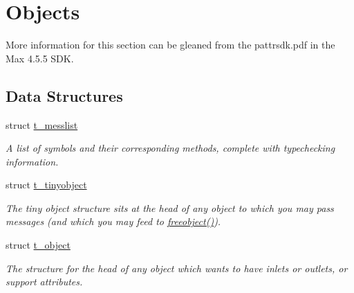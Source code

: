 \hypertarget{group__obj}{
\section{Objects}
\label{group__obj}
}


More information for this section can be gleaned from the pattrsdk.pdf in the Max 4.5.5 SDK.  
\subsection*{Data Structures}
\begin{DoxyCompactItemize}
\item 
struct \hyperlink{structt__messlist}{t\_\-messlist}
\begin{DoxyCompactList}\small\item\em A list of symbols and their corresponding methods, complete with typechecking information. \item\end{DoxyCompactList}\item 
struct \hyperlink{structt__tinyobject}{t\_\-tinyobject}
\begin{DoxyCompactList}\small\item\em The tiny object structure sits at the head of any object to which you may pass messages (and which you may feed to \hyperlink{group__class__old_gadf30646e52376a37b93cc20efac65636}{freeobject()}). \item\end{DoxyCompactList}\item 
struct \hyperlink{structt__object}{t\_\-object}
\begin{DoxyCompactList}\small\item\em The structure for the head of any object which wants to have inlets or outlets, or support attributes. \item\end{DoxyCompactList}\end{DoxyCompactItemize}
